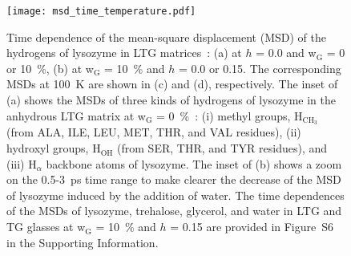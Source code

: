 \documentclass[journal=jpcbfk,manuscript=article]{achemso}
\begin{document}
\begin{singlespacing}
\begin{figure}[htbp]
\texttt{[image: msd\_time\_temperature.pdf]}
\caption{\label{msd_time}
Time dependence of the mean-square displacement (MSD) of the hydrogens of lysozyme in LTG matrices~:
(a) at $h$ = 0.0 and w$_{\textrm{G}}$ = 0 or 10~\%, (b) at w$_{\textrm{G}}$ = 10~\% and
$h$ = 0.0 or 0.15. The corresponding MSDs at 100~K are shown in (c) and (d), respectively.
The inset of (a) shows the MSDs of three kinds of hydrogens of lysozyme in the anhydrous LTG matrix
at w$_{\textrm{G}}$ = 0~\%~: (i) methyl groups, H$_{\textrm{CH}_3}$ (from ALA, ILE, LEU, MET, THR, and VAL residues), 
(ii) hydroxyl groups, H$_{\textrm{OH}}$ (from SER, THR, and TYR residues),
and (iii) H$_{\alpha}$ backbone atoms of lysozyme. The inset of (b) shows a zoom on the 0.5-3~ps time range 
to make clearer the decrease of the MSD of lysozyme induced by the addition of water.
The time dependences of the MSDs of lysozyme, trehalose, glycerol, and water in LTG and TG glasses 
at w$_{\textrm{G}}$ = 10~\% and $h$ = 0.15 are provided in Figure~S6 in the Supporting Information.
}
\end{figure}


\end{singlespacing}
\end{document}
